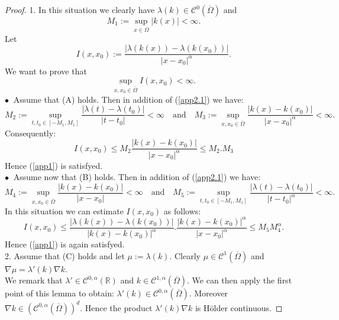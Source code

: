 \documentclass{elsart}
\begin{document}
\begin{proof}
1. In this situation we clearly have $\lambda(k) \in \mathcal{C}^0(\overline{\Omega})$ and  
\begin{equation}
M_1:=\sup\limits_{x \in \overline{\Omega}}|k(x)| < \infty. \label{app2.1}
\end{equation}
Let 
$$I(x,x_0):=\frac{|\lambda(k(x))-\lambda(k(x_0))|}{|x-x_0|^{\alpha}}.$$
We want to prove that 
\begin{equation}
\sup\limits_{x,x_0 \in \overline{\Omega}}I(x,x_0) < \infty. \label{app1}
\end{equation}
$\bullet~$ Assume that (A) holds. Then in addition of (\ref{app2.1}) we have: 
$$M_2:= \sup\limits_{t,t_0 \in [-M_1,M_1]} 
\frac{|\lambda(t)-\lambda(t_0)|}{|t-t_0|} < \infty \quad \text{and} \quad 
M_3:= \sup\limits_{x,x_0 \in \overline{\Omega}} 
\frac{|k(x)-k(x_0)|}{|x-x_0|^{\alpha}} < \infty.$$ 
Consequently: 
$$I(x,x_0) \leq M_2 \frac{|k(x)-k(x_0)|}{|x-x_0|^{\alpha}} \leq M_2.M_3$$
Hence (\ref{app1}) is satisfyed. \\ 
$\bullet~$ Assume now that (B) holds. Then in addition of (\ref{app2.1}) we have: 
$$M_4:= \sup\limits_{x,x_0 \in \overline{\Omega}} 
\frac{|k(x)-k(x_0)|}{|x-x_0|} < \infty \quad \text{and} \quad 
M_5:= \sup\limits_{t,t_0 \in [-M_1,M_1]} 
\frac{|\lambda(t)-\lambda(t_0)|}{|t-t_0|^{\alpha}} < \infty.$$
In this situation we can estimate $I(x,x_0)$ as follows: 
$$I(x,x_0) \leq \frac{|\lambda(k(x))-\lambda(k(x_0))|}{|k(x)-k(x_0)|^{\alpha}}.
\frac{|k(x)-k(x_0)|^{\alpha}}{|x-x_0|^\alpha} \leq M_5 M_4^\alpha.$$ 
Hence (\ref{app1}) is again satisfyed. \\ 

2. Assume that (C) holds and let $\mu:=\lambda(k)$. Clearly 
$\mu \in \mathcal{C}^1(\overline{\Omega})$ and 
$\nabla \mu = \lambda'(k)\nabla k$. \\ 
We remark that $\lambda' \in \mathcal{C}^{0,\alpha}(\mathbb R)$ and  
$k \in \mathcal{C}^{1,\alpha}(\overline{\Omega})$. We can then apply the first point of this lemma to obtain: $\lambda'(k) \in \mathcal{C}^{0,\alpha}(\overline{\Omega})
$. Moreover $\nabla k \in (\mathcal{C}^{0,\alpha}(\overline{\Omega}))^d$. Hence the product $\lambda'(k)\nabla k$ is H\"older continuous.
\end{proof}    

       
  
\end{document}
